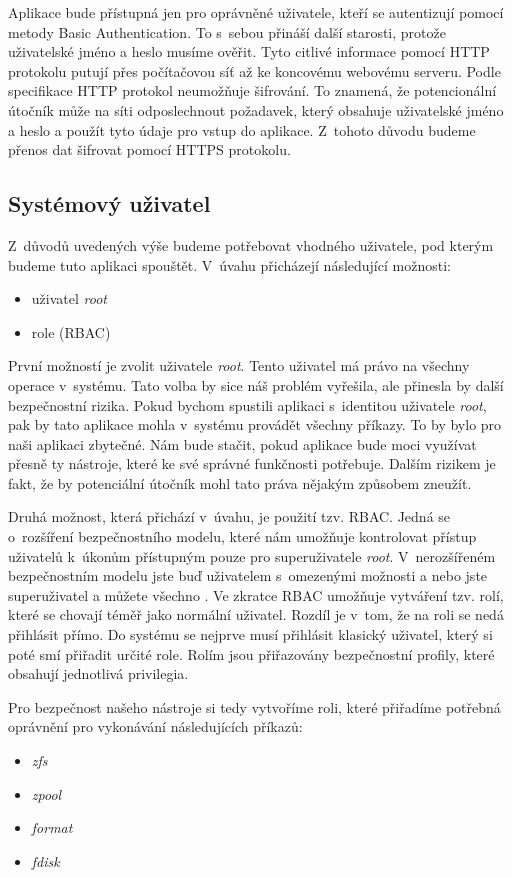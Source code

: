 Aplikace bude přístupná jen pro oprávněné uživatele, kteří se autentizují pomocí metody Basic Authentication. To s~sebou přináší další starosti, protože uživatelské jméno a heslo musíme ověřit. Tyto citlivé informace pomocí HTTP protokolu putují přes počítačovou síť až ke koncovému webovému serveru. Podle specifikace \cite{RFC2616} HTTP protokol neumožňuje šifrování. To znamená, že potencionální útočník může na síti odposlechnout požadavek, který obsahuje uživatelské jméno a heslo a použít tyto údaje pro vstup do aplikace. Z~tohoto důvodu budeme přenos dat šifrovat pomocí HTTPS protokolu.
    \subsection{Systémový uživatel}
    \label{sysuser}
    Z~důvodů uvedených výše budeme potřebovat vhodného uživatele, pod kterým budeme tuto aplikaci spouštět. V~úvahu přicházejí následující možnosti:
    \begin{itemize}
      \item uživatel \emph{root}
      \item role (RBAC)
    \end{itemize}

    První možností je zvolit uživatele \emph{root}. Tento uživatel má právo na všechny operace v~systému. Tato volba by sice náš problém vyřešila, ale přinesla by další bezpečnostní rizika. Pokud bychom spustili aplikaci s~identitou uživatele \emph{root}, pak by tato aplikace mohla v~systému provádět všechny příkazy. To by bylo pro naši aplikaci zbytečné. Nám bude stačit, pokud aplikace bude moci využívat přesně ty nástroje, které ke své správné funkčnosti potřebuje. Dalším rizikem je fakt, že by potenciální útočník mohl tato práva nějakým způsobem zneužít.

    Druhá možnost, která přichází v~úvahu, je použití tzv. RBAC. Jedná se o~rozšíření bezpečnostního modelu, které nám umožňuje kontrolovat přístup uživatelů k~úkonům přístupným pouze pro superuživatele \emph{root}. V~nerozšířeném bezpečnostním modelu jste buď uživatelem s~omezenými možnosti a nebo jste superuživatel a můžete všechno \cite{RBAC}. Ve zkratce RBAC umožňuje vytváření tzv. rolí, které se chovají téměř jako normální uživatel. Rozdíl je v~tom, že na roli se nedá přihlásit přímo. Do systému se nejprve musí přihlásit klasický uživatel, který si poté smí přiřadit určité role. Rolím jsou přiřazovány bezpečnostní profily, které obsahují jednotlivá privilegia.

    Pro bezpečnost našeho nástroje si tedy vytvoříme roli, které přiřadíme potřebná oprávnění pro vykonávání následujících příkazů:
    \begin{itemize}
      \item \emph{zfs}
      \item \emph{zpool}
      \item \emph{format}
      \item \emph{fdisk}
    \end{itemize}

